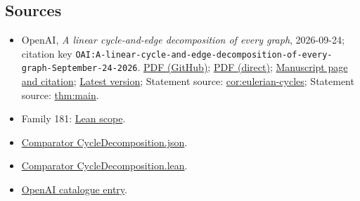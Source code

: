 \documentclass[11pt]{article}
\begin{document}
\subsection{Sources}
\begin{itemize}
\item OpenAI, \emph{A linear cycle-and-edge decomposition of every graph}, 2026-09-24; citation key \texttt{OAI:A-linear-cycle-and-edge-decomposition-of-every-graph-September-24-2026}. \href{https://github.com/openai/math/blob/adc7f1241b42e322a6451854ab7e4b4c146bf78a/preprints/A-linear-cycle-and-edge-decomposition-of-every-graph-September-24-2026/main.pdf}{PDF (GitHub)}; \href{https://github.com/openai/math/raw/adc7f1241b42e322a6451854ab7e4b4c146bf78a/preprints/A-linear-cycle-and-edge-decomposition-of-every-graph-September-24-2026/main.pdf}{PDF (direct)}; \href{https://github.com/openai/math/blob/adc7f1241b42e322a6451854ab7e4b4c146bf78a/preprints/A-linear-cycle-and-edge-decomposition-of-every-graph-September-24-2026/README.md}{Manuscript page and citation}; \href{https://github.com/openai/math/blob/main/preprints/A-linear-cycle-and-edge-decomposition-of-every-graph-September-24-2026/main.pdf}{Latest version}; Statement source: \href{https://github.com/openai/math/blob/adc7f1241b42e322a6451854ab7e4b4c146bf78a/preprints/A-linear-cycle-and-edge-decomposition-of-every-graph-September-24-2026/build/main.tex\#L117}{cor:eulerian-cycles}; Statement source: \href{https://github.com/openai/math/blob/adc7f1241b42e322a6451854ab7e4b4c146bf78a/preprints/A-linear-cycle-and-edge-decomposition-of-every-graph-September-24-2026/build/main.tex\#L62}{thm:main}.
\item Family 181: \href{https://github.com/openai/math/blob/adc7f1241b42e322a6451854ab7e4b4c146bf78a/lean/docs/181.md}{Lean scope}.
\item \href{https://github.com/openai/math/blob/adc7f1241b42e322a6451854ab7e4b4c146bf78a/lean/ComparatorChallenges/CycleDecomposition.json}{Comparator CycleDecomposition.json}.
\item \href{https://github.com/openai/math/blob/adc7f1241b42e322a6451854ab7e4b4c146bf78a/lean/ComparatorChallenges/CycleDecomposition.lean}{Comparator CycleDecomposition.lean}.
\item \href{https://github.com/openai/math/blob/adc7f1241b42e322a6451854ab7e4b4c146bf78a/CONTENTS.md}{OpenAI catalogue entry}.
\end{itemize}
\end{document}
